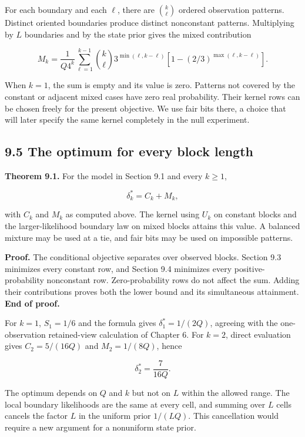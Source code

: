 \documentclass[
]{article}
\begin{document}
For each boundary and each \(\ell\), there are \(\binom{k}{\ell}\)
ordered observation patterns. Distinct oriented boundaries produce
distinct nonconstant patterns. Multiplying by \(L\) boundaries and by
the state prior gives the mixed contribution

\[
M_k=\frac1{Q4^k}\sum_{\ell=1}^{k-1}
\binom{k}{\ell}3^{\min(\ell,k-\ell)}
\left[1-(2/3)^{\max(\ell,k-\ell)}\right].
\]

When \(k=1\), the sum is empty and its value is zero. Patterns not
covered by the constant or adjacent mixed cases have zero real
probability. Their kernel rows can be chosen freely for the present
objective. We use fair bits there, a choice that will later specify the
same kernel completely in the null experiment.

\subsection{9.5 The optimum for every block
length}\label{the-optimum-for-every-block-length}

\textbf{Theorem 9.1.} For the model in Section 9.1 and every \(k\ge1\),

\[
\delta_k^*=C_k+M_k,
\]

with \(C_k\) and \(M_k\) as computed above. The kernel using \(U_k\) on
constant blocks and the larger-likelihood boundary law on mixed blocks
attains this value. A balanced mixture may be used at a tie, and fair
bits may be used on impossible patterns.

\textbf{Proof.} The conditional objective separates over observed
blocks. Section 9.3 minimizes every constant row, and Section 9.4
minimizes every positive-probability nonconstant row. Zero-probability
rows do not affect the sum. Adding their contributions proves both the
lower bound and its simultaneous attainment. \textbf{End of proof.}

For \(k=1\), \(S_1=1/6\) and the formula gives \(\delta_1^*=1/(2Q)\),
agreeing with the one-observation retained-view calculation of Chapter
6. For \(k=2\), direct evaluation gives \(C_2=5/(16Q)\) and
\(M_2=1/(8Q)\), hence

\[
\delta_2^*=\frac7{16Q}.
\]

The optimum depends on \(Q\) and \(k\) but not on \(L\) within the
allowed range. The local boundary likelihoods are the same at every
cell, and summing over \(L\) cells cancels the factor \(L\) in the
uniform prior \(1/(LQ)\). This cancellation would require a new argument
for a nonuniform state prior.
\end{document}
